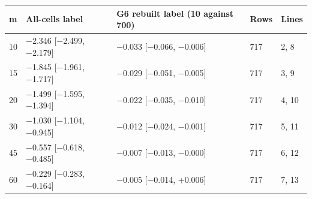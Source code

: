 \begin{tabular}{lllll}
\toprule
m & All-cells label & G6 rebuilt label (10 against 700) & Rows & Lines \\
\midrule
10 & −2.346 [−2.499, −2.179] & −0.033 [−0.066, −0.006] & 717 & 2, 8 \\
15 & −1.845 [−1.961, −1.717] & −0.029 [−0.051, −0.005] & 717 & 3, 9 \\
20 & −1.499 [−1.595, −1.394] & −0.022 [−0.035, −0.010] & 717 & 4, 10 \\
30 & −1.030 [−1.104, −0.945] & −0.012 [−0.024, −0.001] & 717 & 5, 11 \\
45 & −0.557 [−0.618, −0.485] & −0.007 [−0.013, −0.000] & 717 & 6, 12 \\
60 & −0.229 [−0.283, −0.164] & −0.005 [−0.014, +0.006] & 717 & 7, 13 \\
\bottomrule
\end{tabular}
